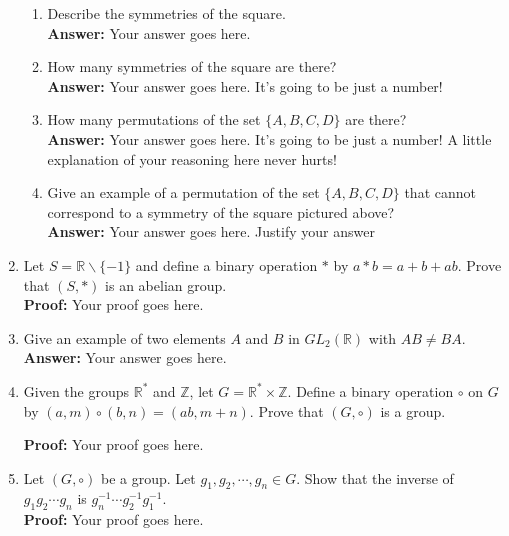 \documentclass[12pt]{article}
\newcommand{\bbZ}{\mathbb{Z}}
\newcommand{\bbR}{\mathbb{R}}
\begin{document}
\begin{enumerate}
	\begin{enumerate}
	\item Describe the symmetries of the square.\\
	\textbf{Answer:} Your answer goes here.
	\vfill
	\item  How many symmetries of the square are there?\\
	\textbf{Answer:} Your answer goes here. It's going to be just a number!
	\vfill
	\item  How many permutations of the set $\{A,B,C,D\}$ are there?\\
	\textbf{Answer:} Your answer goes here. It's going to be just a number! A little explanation of your reasoning here never hurts!
	\vfill
	\item  Give an example of a permutation of the set $\{A,B,C,D\}$ that cannot correspond to a symmetry of the square pictured above?\\
	\textbf{Answer:} Your answer goes here. Justify your answer
		\vfill
	\end{enumerate}
\newpage	
\item Let $S=\bbR \backslash \{-1\}$ and define a binary operation $*$ by $a * b =a+b+ab.$ Prove that $(S,*)$ is an abelian group.\\

\textbf{Proof:} Your proof goes here.

\newpage

\item Give an example of two elements $A$ and $B$ in $GL_2(\bbR)$ with $AB \not = BA.$ \\

\textbf{Answer:} Your answer goes here.

\newpage

\item Given the groups $\bbR^*$ and $\bbZ$, let $G=\bbR^* \times \bbZ.$ Define a binary operation $\circ$ on $G$ by $(a,m) \circ (b,n)=(ab,m+n).$ Prove that $(G,\circ)$ is a group.

\textbf{Proof:} Your proof goes here.

\newpage

\item Let $(G,\circ)$ be a group. Let $g_1,g_2, \cdots, g_n \in G.$ Show that the inverse of $g_1g_2\cdots g_n$ is $g_n^{-1}\cdots g_2^{-1}g_1^{-1}.$\\

\textbf{Proof:} Your proof goes here.


\newpage


\end{enumerate}
\end{document}
